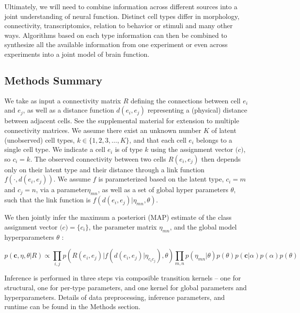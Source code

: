 \documentclass{article}
\renewcommand{\vec}[1]{\mathbf{#1}}
\begin{document}
Ultimately, we will need to combine information across different
sources into a joint understanding of neural function. Distinct cell
types differ in morphology, connectivity, transcriptomics, relation to
behavior or stimuli and many other ways. Algorithms based on each type
information can then be combined to synthesize all the available
information from one experiment or even across experiments into a
joint model of brain function.

\subsection{Methods Summary}

We take as input a connectivity matrix $R$ defining the connections
between cell $e_i$ and $e_j$, as well as a distance function $d(e_i,
e_j)$ representing a (physical) distance between adjacent cells. See
the supplemental material for extension to multiple connectivity
matrices. We assume there exist an unknown number $K$ of latent
(unobserved) cell types, $k \in \{1, 2, 3, \dots, K\}$, and that each
cell $e_i$ belongs to a single cell type. We indicate a cell $e_i$ is
of type $k$ using the assignment vector $\vec(c)$, so $c_i = k$. The
observed connectivity between two cells $R(e_i, e_j)$ then depends
only on their latent type and their distance through a link function
$f(\cdot, d(e_i, e_j))$. We assume $f$ is parameterized based on the
latent type, $c_i=m$ and $c_j=n$, via a parameter$\eta_{mn}$, as well
as a set of global hyper parameters $\theta$, such that the link
function is $f(d(e_i, e_j) | \eta_{mn}, \theta)$. 

We then jointly infer the maximum a posteriori (MAP) estimate of the
class assignment vector $\vec(c) = \{c_i\}$, the parameter matrix $\eta_{mn}$, and
the global model hyperparameters $\theta$ :

\begin{equation}
  p(\vec{c}, \eta, \theta | R ) \propto \prod_{i, j} p(R(e_i, e_j) | f(d(e_i, e_j) | \eta_{c_ic_j}), \theta) \prod_{m, n} p(\eta_{mn} | \theta)  p(\theta) p(\vec{c} | \alpha) p(\alpha) p(\theta)
\end{equation}

Inference is performed in three steps via composible transition 
kernels -- one for structural, one for per-type parameters, and
one kernel for global parameters and hyperparameters. Details
of data preprocessing, inference parameters, and runtime can
be found in the Methods section. 

\printbibliography
\end{document}

